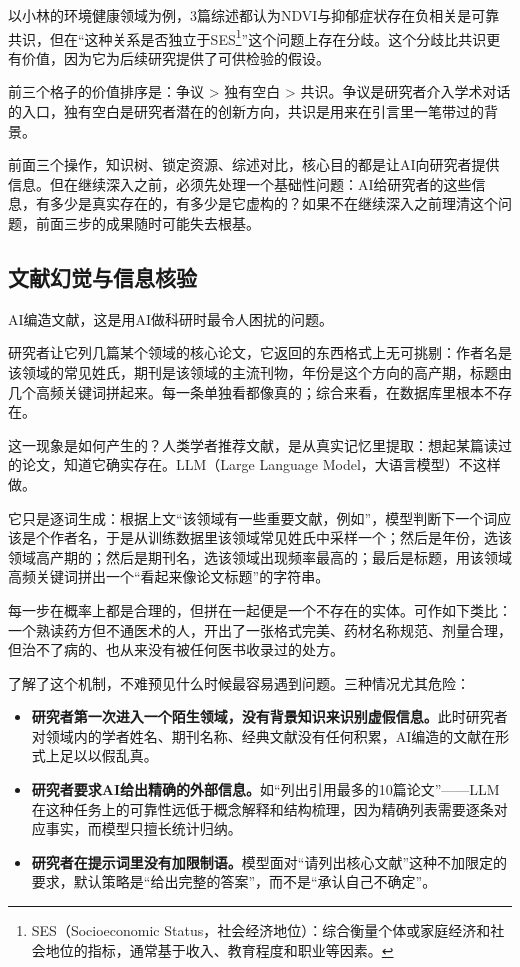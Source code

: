 以小林的环境健康领域为例，3篇综述都认为NDVI与抑郁症状存在负相关是可靠共识，但在``这种关系是否独立于SES\footnote{SES（Socioeconomic Status，社会经济地位）：综合衡量个体或家庭经济和社会地位的指标，通常基于收入、教育程度和职业等因素。}''这个问题上存在分歧。这个分歧比共识更有价值，因为它为后续研究提供了可供检验的假设。

前三个格子的价值排序是：争议 > 独有空白 > 共识。争议是研究者介入学术对话的入口，独有空白是研究者潜在的创新方向，共识是用来在引言里一笔带过的背景。

前面三个操作，知识树、锁定资源、综述对比，核心目的都是让AI向研究者提供信息。但在继续深入之前，必须先处理一个基础性问题：AI给研究者的这些信息，有多少是真实存在的，有多少是它虚构的？如果不在继续深入之前理清这个问题，前面三步的成果随时可能失去根基。

\subsection{文献幻觉与信息核验}

AI编造文献，这是用AI做科研时最令人困扰的问题。

研究者让它列几篇某个领域的核心论文，它返回的东西格式上无可挑剔：作者名是该领域的常见姓氏，期刊是该领域的主流刊物，年份是这个方向的高产期，标题由几个高频关键词拼起来。每一条单独看都像真的；综合来看，在数据库里根本不存在。

这一现象是如何产生的？人类学者推荐文献，是从真实记忆里提取：想起某篇读过的论文，知道它确实存在。LLM（Large Language Model，大语言模型）不这样做。

它只是逐词生成：根据上文``该领域有一些重要文献，例如''，模型判断下一个词应该是个作者名，于是从训练数据里该领域常见姓氏中采样一个；然后是年份，选该领域高产期的；然后是期刊名，选该领域出现频率最高的；最后是标题，用该领域高频关键词拼出一个``看起来像论文标题''的字符串。

每一步在概率上都是合理的，但拼在一起便是一个不存在的实体。可作如下类比：一个熟读药方但不通医术的人，开出了一张格式完美、药材名称规范、剂量合理，但治不了病的、也从来没有被任何医书收录过的处方。

了解了这个机制，不难预见什么时候最容易遇到问题。三种情况尤其危险：

\begin{itemize}[nosep]
\item \textbf{研究者第一次进入一个陌生领域，没有背景知识来识别虚假信息。}此时研究者对领域内的学者姓名、期刊名称、经典文献没有任何积累，AI编造的文献在形式上足以以假乱真。
\item \textbf{研究者要求AI给出精确的外部信息。}如``列出引用最多的10篇论文''——LLM在这种任务上的可靠性远低于概念解释和结构梳理，因为精确列表需要逐条对应事实，而模型只擅长统计归纳。
\item \textbf{研究者在提示词里没有加限制语。}模型面对``请列出核心文献''这种不加限定的要求，默认策略是``给出完整的答案''，而不是``承认自己不确定''。
\end{itemize}

